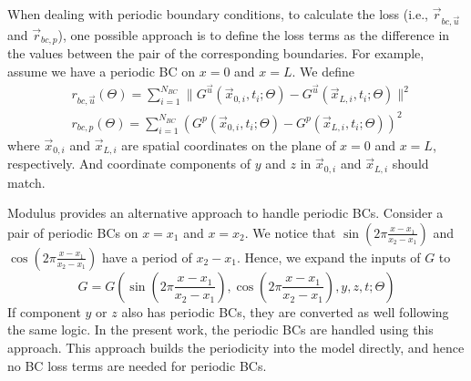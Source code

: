 
When dealing with periodic boundary conditions, to calculate the loss (i.e., $\vec{r}_{bc,\vec{u}}$ and $\vec{r}_{bc, p}$), one possible approach is to define the loss terms as the difference in the values between the pair of the corresponding boundaries.
For example, assume we have a periodic BC on $x=0$ and $x=L$.
We define
\begin{equation}\label{eq:naive-periodic-bc}
    \begin{aligned}
    &r_{bc,\vec{u}}(\Theta) = \sum\limits_{i=1}^{N_{BC}} \lVert G^{\vec{u}}(\vec{x}_{0,i}, t_i; \Theta) - G^{\vec{u}}(\vec{x}_{L,i}, t_i; \Theta) \rVert^2\\
    &r_{bc,p}(\Theta) = \sum\limits_{i=1}^{N_{BC}} ( G^{p}(\vec{x}_{0,i}, t_i; \Theta) - G^{p}(\vec{x}_{L,i}, t_i; \Theta) )^2
    \end{aligned}
\end{equation}
where $\vec{x}_{0,i}$ and $\vec{x}_{L,i}$ are spatial coordinates on the plane of $x=0$ and $x=L$, respectively.
And coordinate components of $y$ and $z$ in $\vec{x}_{0,i}$ and $\vec{x}_{L,i}$ should match.

Modulus provides an alternative approach to handle periodic BCs.
Consider a pair of periodic BCs on $x=x_1$ and $x=x_2$.
We notice that $\sin(2\pi\frac{x-x_1}{x_2-x_1})$ and  $\cos(2\pi\frac{x-x_1}{x_2-x_1})$ have a period of $x_2-x_1$.
Hence, we expand the inputs of $G$ to
\begin{equation}\label{eq:periodic-G}
    G = G(\sin(2\pi\frac{x-x_1}{x_2-x_1}), \cos(2\pi\frac{x-x_1}{x_2-x_1}), y, z, t; \Theta)
\end{equation}
If component $y$ or $z$ also has periodic BCs, they are converted as well following the same logic.
In the present work, the periodic BCs are handled using this approach.
This approach builds the periodicity into the model directly, and hence no BC loss terms are needed for periodic BCs.
